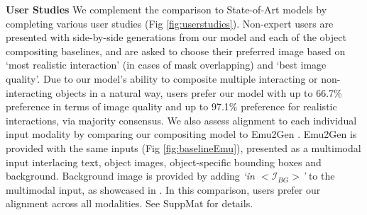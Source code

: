 \noindent
\textbf{User Studies} We complement the comparison to State-of-Art models by completing various user studies (Fig \ref{fig:userstudies}). Non-expert users are presented with side-by-side generations from our model and each of the object compositing baselines, and are asked to choose their preferred image based on `most realistic interaction' (in cases of mask overlapping) and `best image quality'. Due to our model's ability to composite multiple interacting or non-interacting objects in a natural way, users prefer our model with up to 66.7\% preference in terms of image quality and up to 97.1\% preference for realistic interactions, via majority consensus. We also assess alignment to each individual input modality by comparing our compositing model to Emu2Gen \cite{sun2024emugen}. Emu2Gen is provided with the same inputs (Fig \ref{fig:baselineEmu}), presented as a multimodal input interlacing text, object images, object-specific bounding boxes and background. Background image is provided by adding \textit{`in $<\mathcal{I}_{BG}>$'} to the multimodal input, as showcased in \cite{sun2024emugen}. In this comparison, users prefer our alignment across all modalities. See SuppMat for details.






